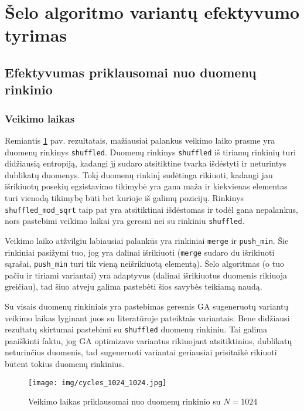 \documentclass{VUMIFInfBakalaurinis}
\begin{document}
\section{Šelo algoritmo variantų efektyvumo tyrimas}

\subsection{Efektyvumas priklausomai nuo duomenų rinkinio}

\subsubsection{Veikimo laikas}

Remiantis \ref{img:cycles_1024_1024} pav. rezultatais, mažiausiai palankus veikimo laiko prasme yra duomenų rinkinys \verb|shuffled|.
Duomenų rinkinys \verb|shuffled| iš tiriamų rinkinių turi didžiausią entropiją, kadangi jį sudaro atsitiktine tvarka išdėstyti ir neturintys dublikatų duomenys.
Tokį duomenų rinkinį sudėtinga rikiuoti, kadangi jau išrikiuotų posekių egzistavimo tikimybė yra gana maža ir
kiekvienas elementas turi vienodą tikimybę būti bet kurioje iš galimų pozicijų.
Rinkinys \verb|shuffled_mod_sqrt| taip pat yra atsitiktinai išdėstomas ir todėl gana nepalankus, nors 
pastebimi veikimo laikai yra geresni nei su rinkiniu \verb|shuffled|.

Veikimo laiko atžvilgiu labiausiai palankūs yra rinkiniai \verb|merge| ir \verb|push_min|.
Šie rinkiniai pasižymi tuo, jog yra dalinai išrikiuoti (\verb|merge| sudaro du išrikiuoti sąrašai, \verb|push_min| turi tik vieną neišrikiuotą elementą).
Šelo algoritmas (o tuo pačiu ir tiriami variantai) yra adaptyvus (dalinai išrikiuotus duomenis rikiuoja greičiau),
tad šiuo atveju galima pastebėti šios savybės teikiamą naudą.

Su visais duomenų rinkiniais yra pastebimas geresnis GA sugeneruotų variantų veikimo laikas lyginant juos su literatūroje pateiktais variantais. 
Bene didžiausi rezultatų skirtumai pastebimi su \verb|shuffled| duomenų rinkiniu.
Tai galima paaiškinti faktu, jog GA optimizavo variantus rikiuojant atsitiktinius, dublikatų neturinčius duomenis, tad sugeneruoti variantai
geriausiai prisitaikė rikiuoti būtent tokius duomenų rinkinius.

\begin{figure}[H]
  \centering
  \texttt{[image: img/cycles\_1024\_1024.jpg]}
  \caption{Veikimo laikas priklausomai nuo duomenų rinkinio su $N = 1024$}
  \label{img:cycles_1024_1024}
\end{figure}
\end{document}
